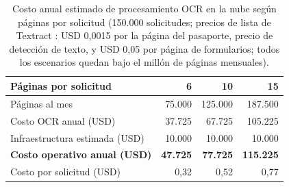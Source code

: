 \documentclass[11pt,a4paper]{article}
\begin{document}
\begin{table}[!htbp]
\centering
\caption{Costo anual estimado de procesamiento OCR en la nube según páginas por solicitud (150.000 solicitudes; precios de lista de Textract \cite{awspricing}: USD 0,0015 por la página del pasaporte, precio de detección de texto, y USD 0,05 por página de formularios; todos los escenarios quedan bajo el millón de páginas mensuales).}
\label{tab:costos}
\small
\begin{tabular}{lrrr}
\toprule
\textbf{Páginas por solicitud} & \textbf{6} & \textbf{10} & \textbf{15} \\
\midrule
Páginas al mes & 75.000 & 125.000 & 187.500 \\
Costo OCR anual (USD) & 37.725 & 67.725 & 105.225 \\
Infraestructura estimada (USD) & 10.000 & 10.000 & 10.000 \\
\textbf{Costo operativo anual (USD)} & \textbf{47.725} & \textbf{77.725} & \textbf{115.225} \\
Costo por solicitud (USD) & 0,32 & 0,52 & 0,77 \\
\bottomrule
\end{tabular}
\end{table}
\end{document}

